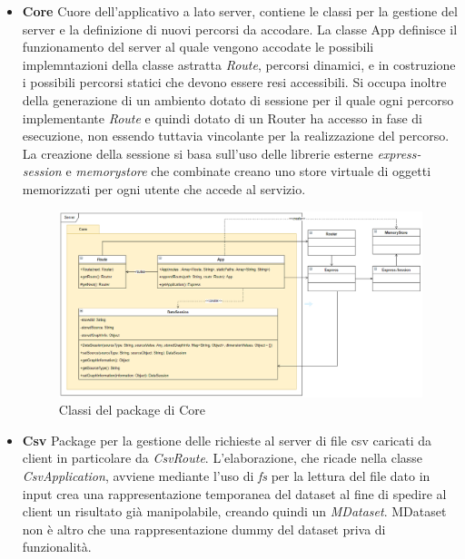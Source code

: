 \documentclass[../manuale_sviluppatore.tex]{subfiles}
\begin{document}
\begin{itemize}
	
	\item \textbf{Core} Cuore dell'applicativo a lato server, contiene le classi per la gestione del server
	e la definizione di nuovi percorsi da accodare. La classe App definisce il funzionamento del server al quale
	vengono accodate le possibili implemntazioni della classe astratta \emph{Route}, percorsi dinamici,
	e in costruzione i possibili percorsi statici che devono essere resi accessibili. Si occupa inoltre della
	generazione di un ambiento dotato di sessione per il quale ogni percorso implementante \emph{Route} e quindi dotato
	di un Router ha accesso in fase di esecuzione, non essendo tuttavia vincolante per la realizzazione del percorso.
	La creazione della sessione si basa sull'uso delle librerie esterne \emph{express-session} e \emph{memorystore}
	che combinate creano uno store virtuale di oggetti memorizzati per ogni utente che accede al servizio.
		
	\begin{figure}[H]
		\centering
		\includegraphics[width=18cm]{img/server-core.png}
		\caption{Classi del package di Core}
	\end{figure}

	\item \textbf{Csv} Package per la gestione delle richieste al server di file csv caricati da client in particolare da \emph{CsvRoute}.
	L'elaborazione, che ricade nella classe \emph{CsvApplication}, avviene mediante l'uso di \emph{fs} per la lettura del file dato in input
	crea una rappresentazione temporanea del dataset al fine di spedire al client un risultato già manipolabile, creando quindi un \emph{MDataset}.
	MDataset non è altro che una rappresentazione dummy del dataset priva di funzionalità.
	

\end{itemize}
\end{document}
